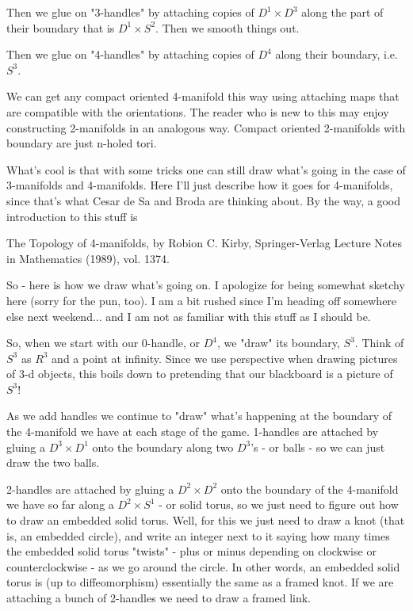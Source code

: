 Then we glue on "3-handles" by attaching copies of $D^1 \times D^3$ along the part of their boundary that is $D^1 \times S^2$. Then we smooth things out.

Then we glue on "4-handles" by attaching copies of $D^4$ along their boundary, i.e. $S^3$.

We can get any compact oriented 4-manifold this way using attaching maps that are compatible with the orientations. The reader who is new to this may enjoy constructing 2-manifolds in an analogous way. Compact oriented 2-manifolds with boundary are just n-holed tori.

What's cool is that with some tricks one can still draw what's going in the case of 3-manifolds and 4-manifolds. Here I'll just describe how it goes for 4-manifolds, since that's what Cesar de Sa and Broda are thinking about. By the way, a good introduction to this stuff is

The Topology of 4-manifolds, by Robion C. Kirby, Springer-Verlag Lecture Notes in Mathematics (1989), vol. 1374.

So - here is how we draw what's going on. I apologize for being somewhat sketchy here (sorry for the pun, too). I am a bit rushed since I'm heading off somewhere else next weekend... and I am not as familiar with this stuff as I should be.

So, when we start with our 0-handle, or $D^4$, we "draw" its boundary, $S^3$. Think of $S^3$ as $R^3$ and a point at infinity. Since we use perspective when drawing pictures of 3-d objects, this boils down to pretending that our blackboard is a picture of $S^3$!

As we add handles we continue to "draw" what's happening at the boundary of the 4-manifold we have at each stage of the game. 1-handles are attached by gluing a $D^3 \times D^1$ onto the boundary along two $D^3$'s - or balls - so we can just draw the two balls.

2-handles are attached by gluing a $D^2 \times D^2$ onto the boundary of the 4-manifold we have so far along a $D^2 \times S^1$ - or solid torus, so we just need to figure out how to draw an embedded solid torus. Well, for this we just need to draw a knot (that is, an embedded circle), and write an integer next to it saying how many times the embedded solid torus "twists" - plus or minus depending on clockwise or counterclockwise - as we go around the circle. In other words, an embedded solid torus is (up to diffeomorphism) essentially the same as a framed knot. If we are attaching a bunch of 2-handles we need to draw a framed link.

